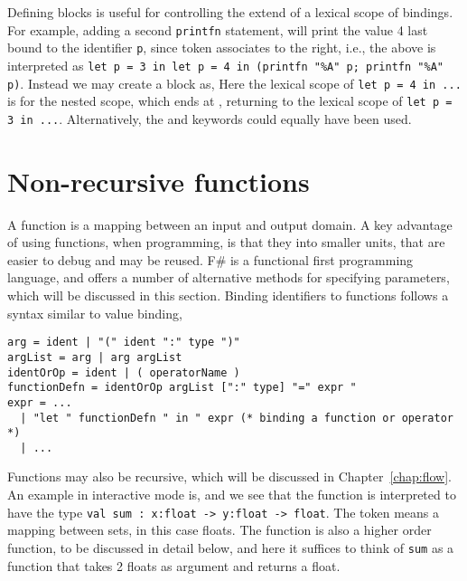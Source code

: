 Defining blocks is useful for controlling the extend of a lexical scope of bindings. For example, adding a second \lstinline!printfn! statement,
%
%
will print the value 4 last bound to the identifier \lstinline!p!, since token \token{;} associates to the right, i.e., the above is interpreted as \lstinline!let p = 3 in let p = 4 in (printfn "%A" p; printfn "%A" p)!. Instead we may create a block as,
%
%
Here the lexical scope of \lstinline!let p = 4 in ...! is for the nested scope, which ends at \token{)}, returning to the lexical scope of \lstinline!let p = 3 in ...!. Alternatively, the  and  keywords could equally have been used.


\section{Non-recursive functions}
\label{sec:functions}
A function is a mapping between an input and output domain. A key advantage of using functions, when programming, is that they  into smaller units, that are easier to debug and may be reused. F\# is a functional first programming language, and offers a number of alternative methods for specifying parameters, which will be discussed in this section. Binding identifiers to functions follows a syntax similar to value binding,
%
\begin{lstlisting}[language=ebnf]
arg = ident | "(" ident ":" type ")"
argList = arg | arg argList
identOrOp = ident | ( operatorName )
functionDefn = identOrOp argList [":" type] "=" expr "
expr = ... 
  | "let " functionDefn " in " expr (* binding a function or operator *) 
  | ...
\end{lstlisting}
Functions may also be recursive, which will be discussed in Chapter~\ref{chap:flow}. An example in interactive mode is,
%
%
and we see that the function is interpreted to have the type \lstinline!val sum : x:float -> y:float -> float!. The \token{->} token means a mapping between sets, in this case floats. The function is also a higher order function, to be discussed in detail below, and here it suffices to think of \lstinline!sum! as a function that takes 2 floats as argument and returns a float.


